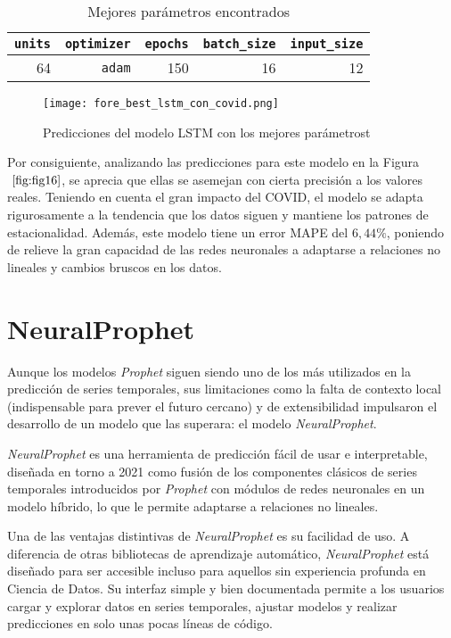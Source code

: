 \documentclass[12pt,twoside]{article}
\begin{document}
\begin{table}[ht] 
\centering
\begin{tabular}{rrrrr} 
  \hline
 \texttt{units} & \texttt{optimizer} & \texttt{epochs} & \texttt{batch\_size} & \texttt{input\_size} \\ 
  \hline
64 & \texttt{adam} & 150 & 16 & 12 \\ 
   \hline
\end{tabular}
\caption{Mejores parámetros encontrados} \label{tab:01}
\end{table}

\begin{figure}[h]
    \centering
    \texttt{[image: fore\_best\_lstm\_con\_covid.png]}
    \caption{Predicciones del modelo LSTM con los mejores parámetrost} 
    \label{fig:fig16}
\end{figure}

Por consiguiente, analizando las predicciones para este modelo en la Figura $~\ref{fig:fig16}$, se aprecia que ellas se asemejan con cierta precisión a los valores reales. Teniendo en cuenta el gran impacto del COVID, el modelo se adapta rigurosamente a la tendencia que los datos siguen y mantiene los patrones de estacionalidad. Además, este modelo tiene un error MAPE del $6,44\%$, poniendo de relieve la gran capacidad de las redes neuronales a adaptarse a relaciones no lineales y cambios bruscos en los datos.

\newpage

\section{NeuralProphet}\label{sec:21}

Aunque los modelos \textit{Prophet} siguen siendo uno de los más utilizados en la predicción de series temporales, sus limitaciones como la falta de contexto local (indispensable para prever el futuro cercano) y de extensibilidad impulsaron el desarrollo de un modelo que las superara: el modelo \textit{NeuralProphet}. 

\textit{NeuralProphet} \cite{np1} es una herramienta de predicción fácil de usar e interpretable, diseñada en torno a 2021 como fusión de los componentes clásicos de series temporales introducidos por \textit{Prophet} con módulos de redes neuronales en un modelo híbrido, lo que le permite adaptarse a relaciones no lineales. 

Una de las ventajas distintivas de \textit{NeuralProphet} es su facilidad de uso. A diferencia de otras bibliotecas de aprendizaje automático, \textit{NeuralProphet} está diseñado para ser accesible incluso para aquellos sin experiencia profunda en Ciencia de Datos. Su interfaz simple y bien documentada permite a los usuarios cargar y explorar datos en series temporales, ajustar modelos y realizar predicciones en solo unas pocas líneas de código.
\end{document}
